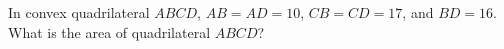 In convex quadrilateral $ABCD$, $AB=AD=10$, $CB=CD=17$, and $BD=16$. What is the area of quadrilateral $ABCD$?
